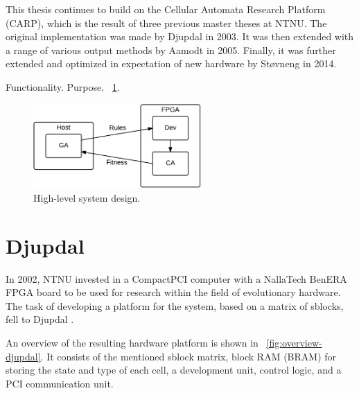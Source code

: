 This thesis continues to build on the Cellular Automata Research Platform (CARP), which is the result of three previous master theses at NTNU.
The original implementation was made by Djupdal in 2003.
It was then extended with a range of various output methods by Aamodt in 2005.
Finally, it was further extended and optimized in expectation of new hardware by Støvneng in 2014.

\TODO
Functionality.
Purpose.
\figurename~\ref{fig:overview-general}.

\begin{figure}[!ht]
    \centering
    \includegraphics[width=0.57\textwidth]{figures/overview-general}
    \caption[System design]{
        High-level system design.
    }
    \label{fig:overview-general}
\end{figure}


\section{Djupdal}

In 2002, NTNU invested in a CompactPCI computer with a NallaTech BenERA FPGA board to be used for research within the field of evolutionary hardware.
The task of developing a platform for the system, based on a matrix of sblocks, fell to Djupdal \cite{djupdal2003sblock}.

An overview of the resulting hardware platform is shown in \figurename~\ref{fig:overview-djupdal}.
It consists of the mentioned sblock matrix, block RAM (BRAM) for storing the state and type of each cell, a development unit, control logic, and a PCI communication unit.

